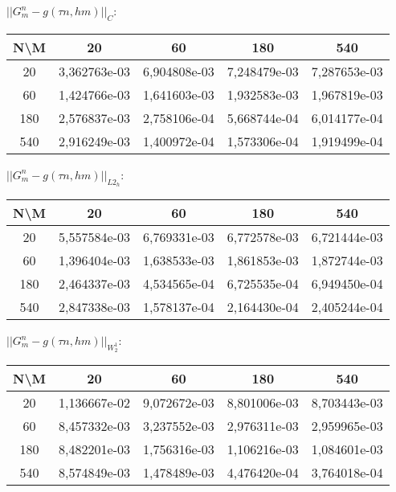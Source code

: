 \documentclass[11pt]{article}
\begin{document}
$||G_m^n - g (\tau n, hm)||_C$:
\begin{center}
\begin{tabular}{|c|c|c|c|c|}
\hline 
 N\textbackslash M &      20      &      60      &     180      &     540      \\ 
 \hline 
        20         & 3,362763e-03 & 6,904808e-03 & 7,248479e-03 & 7,287653e-03 \\ 
 \hline 
        60         & 1,424766e-03 & 1,641603e-03 & 1,932583e-03 & 1,967819e-03 \\ 
 \hline 
        180        & 2,576837e-03 & 2,758106e-04 & 5,668744e-04 & 6,014177e-04 \\ 
 \hline 
        540        & 2,916249e-03 & 1,400972e-04 & 1,573306e-04 & 1,919499e-04 \\ 
 \hline 
\end{tabular}
\end{center}

$||G_m^n - g (\tau n, hm)||_{L2_h}$:
\begin{center}
\begin{tabular}{|c|c|c|c|c|}
\hline 
 N\textbackslash M &      20      &      60      &     180      &     540      \\ 
 \hline 
        20         & 5,557584e-03 & 6,769331e-03 & 6,772578e-03 & 6,721444e-03 \\ 
 \hline 
        60         & 1,396404e-03 & 1,638533e-03 & 1,861853e-03 & 1,872744e-03 \\ 
 \hline 
        180        & 2,464337e-03 & 4,534565e-04 & 6,725535e-04 & 6,949450e-04 \\ 
 \hline 
        540        & 2,847338e-03 & 1,578137e-04 & 2,164430e-04 & 2,405244e-04 \\ 
 \hline 
\end{tabular}
\end{center}

$||G_m^n - g (\tau n, hm)||_{W_2^1}$:
\begin{center}
\begin{tabular}{|c|c|c|c|c|}
\hline 
 N\textbackslash M &      20      &      60      &     180      &     540      \\ 
 \hline 
        20         & 1,136667e-02 & 9,072672e-03 & 8,801006e-03 & 8,703443e-03 \\ 
 \hline 
        60         & 8,457332e-03 & 3,237552e-03 & 2,976311e-03 & 2,959965e-03 \\ 
 \hline 
        180        & 8,482201e-03 & 1,756316e-03 & 1,106216e-03 & 1,084601e-03 \\ 
 \hline 
        540        & 8,574849e-03 & 1,478489e-03 & 4,476420e-04 & 3,764018e-04 \\ 
 \hline 
\end{tabular}
\end{center}
\end{document}
